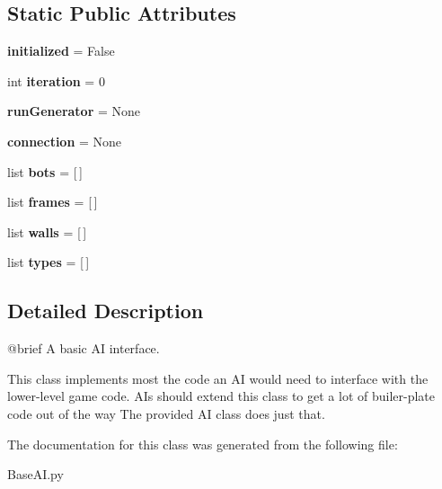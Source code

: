 \subsection*{Static Public Attributes}
\begin{DoxyCompactItemize}
\item 
\hypertarget{classBaseAI_1_1BaseAI_a32a836eb9aad27c111583f24238a686c}{
{\bfseries initialized} = False}
\label{classBaseAI_1_1BaseAI_a32a836eb9aad27c111583f24238a686c}

\item 
\hypertarget{classBaseAI_1_1BaseAI_a54d7182ce68d3d2b55d247c431561f9d}{
int {\bfseries iteration} = 0}
\label{classBaseAI_1_1BaseAI_a54d7182ce68d3d2b55d247c431561f9d}

\item 
\hypertarget{classBaseAI_1_1BaseAI_af78c73cdbcca5a8ed213e2510fbd6e94}{
{\bfseries runGenerator} = None}
\label{classBaseAI_1_1BaseAI_af78c73cdbcca5a8ed213e2510fbd6e94}

\item 
\hypertarget{classBaseAI_1_1BaseAI_a319a81bb1af508789e826e78ee727418}{
{\bfseries connection} = None}
\label{classBaseAI_1_1BaseAI_a319a81bb1af508789e826e78ee727418}

\item 
\hypertarget{classBaseAI_1_1BaseAI_aa6bab172dcc72b435a5fb3278d3d04e7}{
list {\bfseries bots} = \mbox{[}$\,$\mbox{]}}
\label{classBaseAI_1_1BaseAI_aa6bab172dcc72b435a5fb3278d3d04e7}

\item 
\hypertarget{classBaseAI_1_1BaseAI_a624a3b6f071e5d79a884bf87d036ed33}{
list {\bfseries frames} = \mbox{[}$\,$\mbox{]}}
\label{classBaseAI_1_1BaseAI_a624a3b6f071e5d79a884bf87d036ed33}

\item 
\hypertarget{classBaseAI_1_1BaseAI_a7d91c75817bc5a92c703225f5d65749b}{
list {\bfseries walls} = \mbox{[}$\,$\mbox{]}}
\label{classBaseAI_1_1BaseAI_a7d91c75817bc5a92c703225f5d65749b}

\item 
\hypertarget{classBaseAI_1_1BaseAI_a215884bd35440caa62fd5e9be088ac2f}{
list {\bfseries types} = \mbox{[}$\,$\mbox{]}}
\label{classBaseAI_1_1BaseAI_a215884bd35440caa62fd5e9be088ac2f}

\end{DoxyCompactItemize}


\subsection{Detailed Description}
\begin{DoxyVerb}@brief A basic AI interface.

This class implements most the code an AI would need to interface with the lower-level game code.
AIs should extend this class to get a lot of builer-plate code out of the way
The provided AI class does just that.
\end{DoxyVerb}
 

The documentation for this class was generated from the following file:\begin{DoxyCompactItemize}
\item 
BaseAI.py\end{DoxyCompactItemize}
